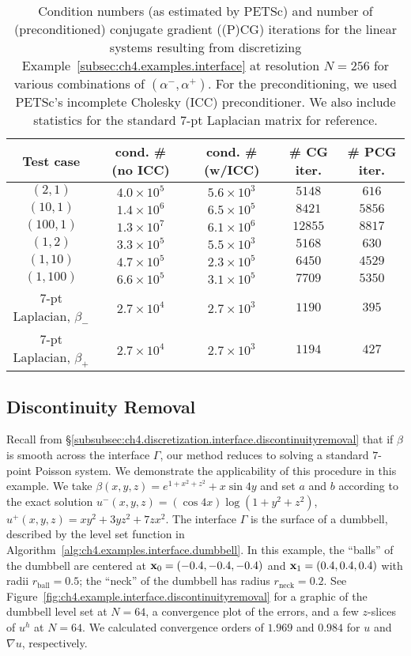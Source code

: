 \begin{table}[htbp]
\centering
\begin{tabular}{|c|c|c|c|c|}
\hline
Test case & cond. \# (no ICC) & cond. \# (w/ICC) & \# CG iter. & \# PCG iter. \\
\hline
$(2,1)$ & $4.0 \times 10^5$ & $5.6 \times 10^3$ & $5148$ & $616$ \\
\hline
$(10,1)$ & $1.4 \times 10^6$ & $6.5 \times 10^5$ & $8421$ & $5856$ \\
\hline
$(100,1)$ & $1.3 \times 10^7$ & $6.1 \times 10^6$ & $12855$ & $8817$ \\
\hline
$(1,2)$ & $3.3 \times 10^5$ & $5.5 \times 10^3$ & $5168$ & $630$ \\
\hline
$(1,10)$ & $4.7 \times 10^5$ & $2.3 \times 10^5$ & $6450$ & $4529$ \\
\hline
$(1,100)$ & $6.6 \times 10^5$ & $3.1 \times 10^5$ & $7709$ & $5350$ \\
\hline
$7$-pt Laplacian, $\beta_-$ & $2.7 \times 10^4$ & $2.7 \times 10^3$ & $1190$ & $395$ \\
\hline
$7$-pt Laplacian, $\beta_+$ & $2.7 \times 10^4$ & $2.7 \times 10^3$ & $1194$ & $427$ \\
\hline
\end{tabular}
\caption{Condition numbers (as estimated by PETSc) and number of (preconditioned) conjugate gradient ((P)CG) iterations for the linear systems resulting from discretizing Example~\ref{subsec:ch4.examples.interface} at resolution $N = 256$ for various combinations of $(\alpha^-, \alpha^+)$. For the preconditioning, we used PETSc's incomplete Cholesky (ICC) preconditioner. We also include statistics for the standard $7$-pt Laplacian matrix for reference.}
\label{tab:ch4.examples.interface}
\end{table} 

\subsection{Discontinuity Removal} \label{subsubsec:ch4.example.interface.discontinuityremoval}

Recall from \S\ref{subsubsec:ch4.discretization.interface.discontinuityremoval} that if $\beta$ is smooth across the interface $\Gamma$, our method reduces to solving a standard $7$-point Poisson system. We demonstrate the applicability of this procedure in this example. We take $\beta(x,y,z) = e^{1 + x^2 + z^2} + x \sin 4y$ and set $a$ and $b$ according to the exact solution $u^-(x,y,z) = (\cos 4x) \log(1 + y^2 + z^2)$, $u^+(x,y,z) = x y^2 + 3 y z^2 + 7 z x^2$. The interface $\Gamma$ is the surface of a dumbbell, described by the level set function in Algorithm~\ref{alg:ch4.examples.interface.dumbbell}. In this example, the ``balls'' of the dumbbell are centered at $\mathbf{x}_0 = (-0.4,-0.4,-0.4)$ and $\mathbf{x}_1 = (0.4,0.4,0.4)$ with radii $r_{\text{ball}} = 0.5$; the ``neck'' of the dumbbell has radius $r_{\text{neck}} = 0.2$. See Figure~\ref{fig:ch4.example.interface.discontinuityremoval} for a graphic of the dumbbell level set at $N = 64$, a convergence plot of the errors, and a few $z$-slices of $u^h$ at $N = 64$. We calculated convergence orders of $1.969$ and $0.984$ for $u$ and $\nabla u$, respectively.

